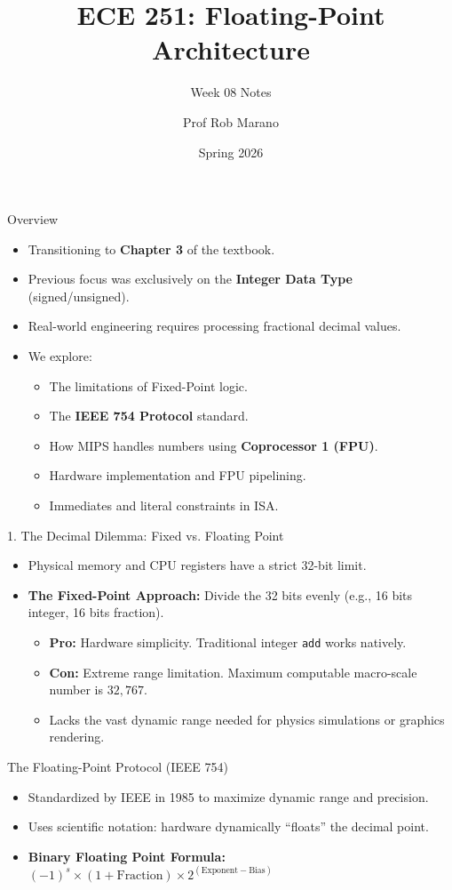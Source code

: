 \documentclass[aspectratio=169]{beamer}
\title{ECE 251: Floating-Point Architecture}
\subtitle{Week 08 Notes}
\author{Prof Rob Marano}
\date{Spring 2026}
\begin{document}
\frame{\titlepage}

\begin{frame}{Overview}
\begin{itemize}
    \item Transitioning to \textbf{Chapter 3} of the textbook.
    \item Previous focus was exclusively on the \textbf{Integer Data Type} (signed/unsigned).
    \item Real-world engineering requires processing fractional decimal values.
    \item We explore:
    \begin{itemize}
        \item The limitations of Fixed-Point logic.
        \item The \textbf{IEEE 754 Protocol} standard.
        \item How MIPS handles numbers using \textbf{Coprocessor 1 (FPU)}.
        \item Hardware implementation and FPU pipelining.
        \item Immediates and literal constraints in ISA.
    \end{itemize}
\end{itemize}
\end{frame}

\begin{frame}{1. The Decimal Dilemma: Fixed vs. Floating Point}
\begin{itemize}
    \item Physical memory and CPU registers have a strict 32-bit limit.
    \item \textbf{The Fixed-Point Approach:} Divide the 32 bits evenly (e.g., 16 bits integer, 16 bits fraction).
    \begin{itemize}
        \item \textbf{Pro:} Hardware simplicity. Traditional integer \texttt{add} works natively.
        \item \textbf{Con:} Extreme range limitation. Maximum computable macro-scale number is $32,767$.
        \item Lacks the vast dynamic range needed for physics simulations or graphics rendering.
    \end{itemize}
\end{itemize}
\end{frame}

\begin{frame}{The Floating-Point Protocol (IEEE 754)}
\begin{itemize}
    \item Standardized by IEEE in 1985 to maximize dynamic range and precision.
    \item Uses scientific notation: hardware dynamically ``floats'' the decimal point.
    \item \textbf{Binary Floating Point Formula:} $(-1)^{s} \times (1 + \text{Fraction}) \times 2^{(\text{Exponent} - \text{Bias})}$
\end{itemize}
\end{frame}
\end{document}
